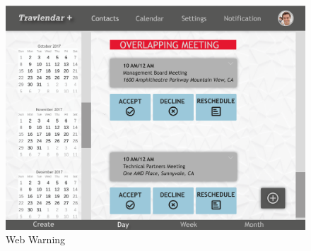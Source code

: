 \begin{figure}[!h]
\begin{minipage}{.65\textwidth}
		\includegraphics[width=\linewidth]{Images/Mockups/MockupWarningWeb.png}
		\caption{Web Warning}
	\end{minipage}
\end{figure}

